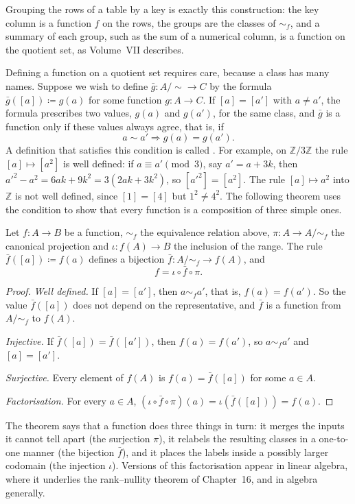 Grouping the rows of a table by a key is exactly this construction: the key column is a function $f$ on the rows, the groups are the classes of $\sim_f$, and a summary of each group, such as the sum of a numerical column, is a function on the quotient set, as Volume~VII describes.

Defining a function on a quotient set requires care, because a class has many names. Suppose we wish to define $\bar g\colon A/{\sim}\to C$ by the formula $\bar g([a])\coloneqq g(a)$ for some function $g\colon A\to C$. If $[a]=[a']$ with $a\ne a'$, the formula prescribes two values, $g(a)$ and $g(a')$, for the same class, and $\bar g$ is a function only if these values always agree, that is, if
\[
a\sim a'\Rightarrow g(a)=g(a').
\]
A definition that satisfies this condition is called . For example, on $\mathbb Z/3\mathbb Z$ the rule $[a]\mapsto[a^2]$ is well defined: if $a\equiv a'\pmod3$, say $a'=a+3k$, then $a'^2-a^2=6ak+9k^2=3(2ak+3k^2)$, so $[a'^2]=[a^2]$. The rule $[a]\mapsto a^2$ into $\mathbb Z$ is not well defined, since $[1]=[4]$ but $1^2\ne4^2$. The following theorem uses the condition to show that every function is a composition of three simple ones.

\begin{theorem}
\label{thm:factorisation}
Let $f\colon A\to B$ be a function, $\sim_f$ the equivalence relation above, $\pi\colon A\to A/{\sim_f}$ the canonical projection and $\iota\colon f(A)\to B$ the inclusion of the range. The rule $\bar f([a])\coloneqq f(a)$ defines a bijection $\bar f\colon A/{\sim_f}\to f(A)$, and
\[
f=\iota\circ\bar f\circ\pi .
\]
\end{theorem}

\begin{proof}
\emph{Well defined.} If $[a]=[a']$, then $a\sim_fa'$, that is, $f(a)=f(a')$. So the value $\bar f([a])$ does not depend on the representative, and $\bar f$ is a function from $A/{\sim_f}$ to $f(A)$.

\emph{Injective.} If $\bar f([a])=\bar f([a'])$, then $f(a)=f(a')$, so $a\sim_fa'$ and $[a]=[a']$.

\emph{Surjective.} Every element of $f(A)$ is $f(a)=\bar f([a])$ for some $a\in A$.

\emph{Factorisation.} For every $a\in A$, $(\iota\circ\bar f\circ\pi)(a)=\iota(\bar f([a]))=f(a)$.
\end{proof}

The theorem says that a function does three things in turn: it merges the inputs it cannot tell apart (the surjection $\pi$), it relabels the resulting classes in a one-to-one manner (the bijection $\bar f$), and it places the labels inside a possibly larger codomain (the injection $\iota$). Versions of this factorisation appear in linear algebra, where it underlies the rank--nullity theorem of Chapter~16, and in algebra generally.


